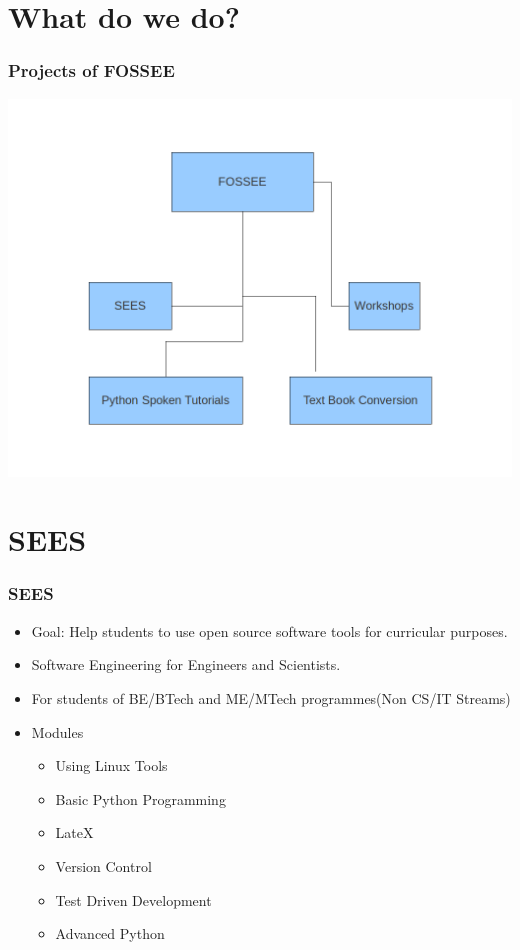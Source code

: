 \documentclass{beamer}
\begin{document}
\section{What do we do?}
\begin{frame}
  \frametitle{Projects of FOSSEE}
  \begin{center}
  	\includegraphics[scale=0.25]{st.png}
  \end{center}
\end{frame}

\section{SEES}
\begin{frame}
  \frametitle{SEES}
    \begin{itemize}
    \item Goal: Help students to use open source software tools for curricular purposes. 
    \item Software Engineering for Engineers and Scientists.
    \item For students of BE/BTech and ME/MTech programmes(Non CS/IT Streams)
    \item Modules 
    \begin{itemize}
    \item Using Linux Tools
	\item Basic Python Programming
	\item LateX
	\item Version Control
	\item Test Driven Development
	\item Advanced Python
    \end{itemize}
	\end{itemize}
\end{frame}
\end{document}
